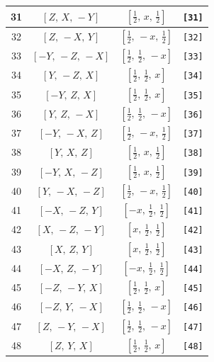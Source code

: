 \documentclass[fleqn,8pt]{jsarticle}
\begin{document}
\begin{longtable}{cccc}
31 & $\left[ Z,\, X,\, - Y \right]$ & $\left[ \frac{1}{2},\, x,\, \frac{1}{2} \right]$ & {\tt [31]} \\ \hline
32 & $\left[ Z,\, - X,\, Y \right]$ & $\left[ \frac{1}{2},\, - x,\, \frac{1}{2} \right]$ & {\tt [32]} \\ \hline
33 & $\left[ - Y,\, - Z,\, - X \right]$ & $\left[ \frac{1}{2},\, \frac{1}{2},\, - x \right]$ & {\tt [33]} \\ \hline
34 & $\left[ Y,\, - Z,\, X \right]$ & $\left[ \frac{1}{2},\, \frac{1}{2},\, x \right]$ & {\tt [34]} \\ \hline
35 & $\left[ - Y,\, Z,\, X \right]$ & $\left[ \frac{1}{2},\, \frac{1}{2},\, x \right]$ & {\tt [35]} \\ \hline
36 & $\left[ Y,\, Z,\, - X \right]$ & $\left[ \frac{1}{2},\, \frac{1}{2},\, - x \right]$ & {\tt [36]} \\ \hline
37 & $\left[ - Y,\, - X,\, Z \right]$ & $\left[ \frac{1}{2},\, - x,\, \frac{1}{2} \right]$ & {\tt [37]} \\ \hline
38 & $\left[ Y,\, X,\, Z \right]$ & $\left[ \frac{1}{2},\, x,\, \frac{1}{2} \right]$ & {\tt [38]} \\ \hline
39 & $\left[ - Y,\, X,\, - Z \right]$ & $\left[ \frac{1}{2},\, x,\, \frac{1}{2} \right]$ & {\tt [39]} \\ \hline
40 & $\left[ Y,\, - X,\, - Z \right]$ & $\left[ \frac{1}{2},\, - x,\, \frac{1}{2} \right]$ & {\tt [40]} \\ \hline
41 & $\left[ - X,\, - Z,\, Y \right]$ & $\left[ - x,\, \frac{1}{2},\, \frac{1}{2} \right]$ & {\tt [41]} \\ \hline
42 & $\left[ X,\, - Z,\, - Y \right]$ & $\left[ x,\, \frac{1}{2},\, \frac{1}{2} \right]$ & {\tt [42]} \\ \hline
43 & $\left[ X,\, Z,\, Y \right]$ & $\left[ x,\, \frac{1}{2},\, \frac{1}{2} \right]$ & {\tt [43]} \\ \hline
44 & $\left[ - X,\, Z,\, - Y \right]$ & $\left[ - x,\, \frac{1}{2},\, \frac{1}{2} \right]$ & {\tt [44]} \\ \hline
45 & $\left[ - Z,\, - Y,\, X \right]$ & $\left[ \frac{1}{2},\, \frac{1}{2},\, x \right]$ & {\tt [45]} \\ \hline
46 & $\left[ - Z,\, Y,\, - X \right]$ & $\left[ \frac{1}{2},\, \frac{1}{2},\, - x \right]$ & {\tt [46]} \\ \hline
47 & $\left[ Z,\, - Y,\, - X \right]$ & $\left[ \frac{1}{2},\, \frac{1}{2},\, - x \right]$ & {\tt [47]} \\ \hline
48 & $\left[ Z,\, Y,\, X \right]$ & $\left[ \frac{1}{2},\, \frac{1}{2},\, x \right]$ & {\tt [48]} \\
\end{longtable}
\end{document}
